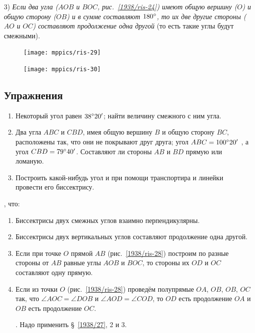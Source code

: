 \documentclass[oneside]{book}
\begin{document}
3) \emph{Если два угла ($AOB$ и $BOC$, рис.~\ref{1938/ris-24}) имеют общую вершину ($O$) и общую сторону ($OB$) и в сумме составляют $180\degree$, то их две другие стороны ($AO$ и $OC$) составляют продолжение одна другой} (то есть такие углы будут смежными).

\begin{figure}
\begin{minipage}{.48\textwidth}
\centering
\texttt{[image: mppics/ris-29]}
\caption{}\label{1938/ris-29}
\end{minipage}\hfill
\begin{minipage}{.48\textwidth}
\centering
\texttt{[image: mppics/ris-30]}
\caption{}\label{1938/ris-30}
\end{minipage}
\end{figure}


\subsection*{Упражнения}

\begin{enumerate}

 \item
Некоторый угол равен $38\degree 20'$;
найти величину смежного с ним угла.

 \item
Два угла $ABC$ и $CBD$, имея общую вершину $B$ и общую сторону $BC$, расположены так, что они не покрывают друг друга;
угол $ABC = 100\degree20'$ , а угол $CBD = 79\degree 40'$.
Составляют ли стороны $AB$ и $BD$ прямую или ломаную.

 \item
Построить какой-нибудь угол и при помощи транспортира и линейки провести его биссектрису.

\end{enumerate}

\smallskip
{}, что:

\begin{enumerate}[resume]
 \item
Биссектрисы двух смежных углов взаимно перпендикулярны.

 \item
Биссектрисы двух вертикальных углов составляют продолжение одна другой.

 \item
Если при точке $O$ прямой $AB$ (рис.~\ref{1938/ris-28}) построим по разные стороны от $AB$ равные углы $AOB$ и $BOC$, то стороны их $OD$ и $OC$ составляют одну прямую.

 \item
Если из точки $O$ (рис.~\ref{1938/ris-28}) проведём полупрямые $OA$, $OB$, $OB$, $OC$ так, что $\angle AOC = \angle DOB$ и $\angle AOD=\angle COD$, то $OD$ есть продолжение $OA$ и $OB$ есть продолжение $OC$.

\smallskip
{}.
Надо применить §~\ref{1938/27}, 2 и 3.

\end{enumerate}
\end{document}
